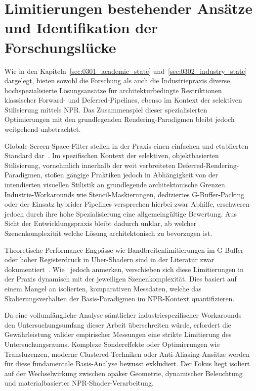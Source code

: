 \section{Limitierungen bestehender Ansätze und Identifikation der Forschungslücke}
\label{sec:0303_usp}

Wie in den Kapiteln~\ref{sec:0301_academic_state} und~\ref{sec:0302_industry_state} dargelegt, bieten sowohl die
Forschung als auch die Industriepraxis diverse, hochspezialisierte Lösungsansätze für architekturbedingte
Restriktionen klassischer Forward- und Deferred-Pipelines, ebenso im Kontext der selektiven Stilisierung
mittels \ac{NPR}.
Das Zusammenspiel dieser spezialisierten Optimierungen mit den grundlegenden Rendering-Paradigmen bleibt jedoch
weitgehend unbetrachtet.

Globale Screen-Space-Filter stellen in der Praxis einen einfachen und etablierten Standard
dar~\parencite[vgl.][S.~147]{magdicsPostprocessingNPREffects2013}.
Im spezifischen Kontext der selektiven, objektbasierten Stilisierung, vornehmlich innerhalb der weit verbreiteten
Deferred-Rendering-Paradigmen, stoßen gängige Praktiken jedoch in Abhängigkeit von der intendierten visuellen Stilistik
an grundlegende architektonische Grenzen.
Industrie-Workarounds wie Stencil-Maskierungen, dediziertes \ac{G-Buffer}-Packing oder der Einsatz hybrider Pipelines
versprechen hierbei zwar Abhilfe, erschweren jedoch durch ihre hohe Spezialisierung eine allgemeingültige Bewertung.
Aus Sicht der Entwicklungspraxis bleibt dadurch unklar, ab welcher Szenenkomplexität welche Lösung architektonisch zu
bevorzugen ist.

Theoretische Performance-Engpässe wie Bandbreitenlimitierungen im \ac{G-Buffer} oder hoher Registerdruck in
Uber-Shadern sind in der Literatur zwar
dokumentiert~\parencites(vgl.)()[S.~881]{akenine-mollerRealtimeRendering2019}[Abschn.~2.6]{Thaler2011DeferredRendering}
[Abschn.~6]{schiedDeferredAttributeInterpolation2015}.
Wie~\textcite[S.~905]{akenine-mollerRealtimeRendering2019} jedoch anmerken, verschieben sich diese Limitierungen in der
Praxis dynamisch mit der jeweiligen Szenenkomplexität.
Dies basiert auf einem Mangel an isolierten, komparativen Messdaten, welche das Skalierungsverhalten der
Basis-Paradigmen im \ac{NPR}-Kontext quantifizieren.

Da eine vollumfängliche Analyse sämtlicher industriespezifischer Workarounds den Untersuchungsumfang dieser Arbeit
überschreiten würde, erfordert die Gewährleistung valider empirischer Messungen eine strikte Limitierung des
Untersuchungsraums.
Komplexe Sondereffekte oder Optimierungen wie Transluzenzen, moderne Clustered-Techniken oder Anti-Aliasing-Ansätze
werden für diese fundamentale Basis-Analyse bewusst exkludiert.
Der Fokus liegt isoliert auf der Wechselwirkung zwischen opaker Geometrie, dynamischer Beleuchtung und materialbasierter
\ac{NPR}-Shader-Verarbeitung.

